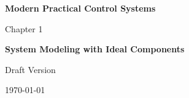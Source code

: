 \documentclass[11pt,letterpaper]{book}
\begin{document}
\begin{titlepage}
\centering
\vspace*{3cm}

{\Huge\bfseries\color{chaptercolor} Modern Practical Control Systems \par}
\vspace{1cm}
{\Large Chapter 1 \par}
\vspace{0.5cm}
{\LARGE\bfseries System Modeling with Ideal Components \par}

\vspace{3cm}

{\Large \authorname \par}
\vspace{0.3cm}
{\large \authordepartment \par}
{\large \authorinstitution \par}

\vfill

{\large Draft Version \par}
{\large \today \par}
\end{titlepage}

\tableofcontents
\newpage










\end{document}
